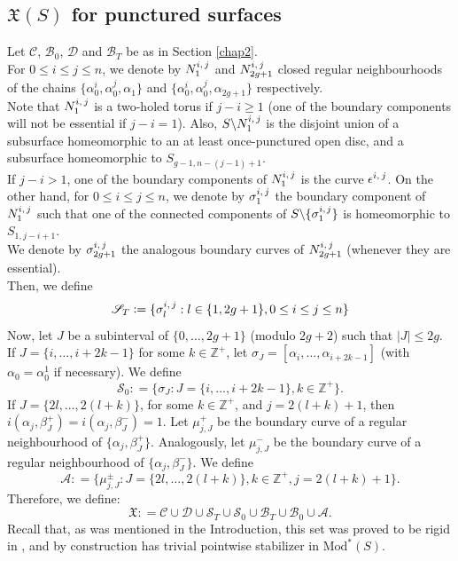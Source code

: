 \documentclass[twoside,11pt,a4paper]{article}
\newcommand*{\EMod}[1]{\mathrm{Mod}^{*}(#1)}
\newcommand*{\X}{\mathfrak{X}}
\newcommand*{\Cf}{\mathscr{C}}
\newcommand*{\Bf}{\mathscr{B}}
\newcommand*{\Sf}{\mathscr{S}}
\newcommand*{\Mf}{\mathscr{A}}
\newcommand*{\Df}{\mathscr{D}}
\newcommand*{\N}[3]{N_{#1}^{#2, \hspace{0.05cm} #3}}
\newcommand*{\eps}[2]{\epsilon^{#1, \hspace{0.05cm} #2}}
\newcommand*{\ColonEqq}{\mathrel{\mathop:}=}
\begin{document}
\subsection{$\X(S)$ for punctured surfaces}\label{chap3sec1subsec2}
\indent Let $\Cf$, $\Bf_{0}$, $\Df$ and $\Bf_{T}$ be as in Section \ref{chap2}.\\
\indent For $0 \leq i \leq j \leq n$, we denote by $N_{1}^{i, \hspace{0.05cm} j}$ and $N_{2g+1}^{i, \hspace{0.05cm} j}$ closed regular neighbourhoods of the chains $\{\alpha_{0}^{i}, \alpha_{0}^{j}, \alpha_{1}\}$ and $\{\alpha_{0}^{i}, \alpha_{0}^{j}, \alpha_{2g+1}\}$ respectively.\\
\indent Note that $\N{1}{i}{j}$ is a two-holed torus if $j - i \geq 1$ (one of the boundary components will not be essential if $j - i = 1$). Also, $S \backslash \N{1}{i}{j}$ is the disjoint union of a subsurface homeomorphic to an at least once-punctured open disc, and a subsurface homeomorphic to $S_{g-1,n-(j-1)+1}$.\\
\indent If $j - i > 1$, one of the boundary components of $\N{1}{i}{j}$ is the curve $\eps{i}{j}$. On the other hand, for $0 \leq i \leq j \leq n$, we denote by $\sigma_{1}^{i, \hspace{0.05cm} j}$ the boundary component of $\N{1}{i}{j}$ such that one of the connected components of $S \backslash \{\sigma_{1}^{i, \hspace{0.03cm} j}\}$ is homeomorphic to $S_{1,j-i + 1}$.\\
\indent We denote by $\sigma_{2g+1}^{i, \hspace{0.05cm} j}$ the analogous boundary curves of $\N{2g+1}{i}{j}$ (whenever they are essential).\\
\indent Then, we define $$\Sf_{T} \ColonEqq \{\sigma_{l}^{i, \hspace{0.05cm} j} : l \in \{1,2g+1\}, 0 \leq i \leq j \leq n\}$$
\indent Now, let $J$ be a subinterval of $\{0, \ldots, 2g+1\}$ (modulo $2g+2$) such that $|J| \leq 2g$.\\
\indent If $J = \{i, \ldots, i + 2k-1\}$ for some $k \in \mathbb{Z}^{+}$, let $\sigma_{J} = [\alpha_{i}, \ldots, \alpha_{i+2k-1}]$ (with $\alpha_{0} = \alpha_{0}^{1}$ if necessary). We define $$\Sf_{0} \ColonEqq \{\sigma_{J} : J = \{i, \ldots, i + 2k-1\}, k \in \mathbb{Z}^{+}\}.$$
\indent If $J = \{2l, \ldots, 2(l+k)\}$, for some $k \in \mathbb{Z}^{+}$, and $j = 2(l+k) +1$, then $i(\alpha_{j},\beta_{J}^{+}) = i(\alpha_{j},\beta_{J}^{-}) = 1$. Let $\mu_{j,J}^{+}$ be the boundary curve of a regular neighbourhood of $\{\alpha_{j},\beta_{J}^{+}\}$. Analogously, let $\mu_{j,J}^{-}$ be the boundary curve of a regular neighbourhood of $\{\alpha_{j},\beta_{J}^{-}\}$. We define $$\Mf \ColonEqq \{\mu_{j,J}^{\pm} : J = \{2l, \ldots, 2(l+k)\}, k \in \mathbb{Z}^{+}, j = 2(l+k) +1\}.$$
\indent Therefore, we define: $$\X \ColonEqq \Cf \cup \Df \cup \Sf_{T} \cup \Sf_{0} \cup \Bf_{T} \cup \Bf_{0} \cup \Mf.$$
\indent Recall that, as was mentioned in the Introduction, this set was proved to be rigid in \cite{Ara1}, and by construction has trivial pointwise stabilizer in $\EMod{S}$.
\end{document}
